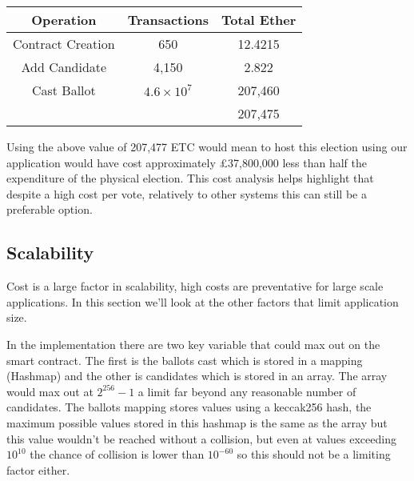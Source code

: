 \documentclass{entcs}
\begin{document}
\begin{table}[h!]
\centering
\begin{tabular}{|c c c|}
 \hline
 Operation & Transactions & Total Ether \\ 
 \hline
 Contract Creation & 650 & 12.4215\\  
 Add Candidate & 4,150 & 2.822\\  
 Cast Ballot & \(4.6 \times 10^7\) & 207,460 \\  
 \hline
  & & 207,475 \\
 \hline
\end{tabular}
\end{table}

Using the above value of 207,477 ETC would mean to host this election using our application would have cost approximately £37,800,000 less than half the expenditure of the physical election. This cost analysis helps highlight that despite a high cost per vote, relatively to other systems this can still be a preferable option.

\subsection{Scalability} \label{sec: scalability}
Cost is a large factor in scalability, high costs are preventative for large scale applications. In this section we'll look at the other factors that limit application size.

In the implementation there are two key variable that could max out on the smart contract. The first is the ballots cast which is stored in a mapping (Hashmap) and the other is candidates which is stored in an array. The array would max out at \(2^{256} -1 \) a limit far beyond any reasonable number of candidates. The ballots mapping stores values using a keccak256 hash, the maximum possible values stored in this hashmap is the same as the array but this value wouldn't be reached without a collision, but even at values exceeding \(10^10\) the chance of collision is lower than \(10^{-60}\) so this should not be a limiting factor either.
\end{document}
